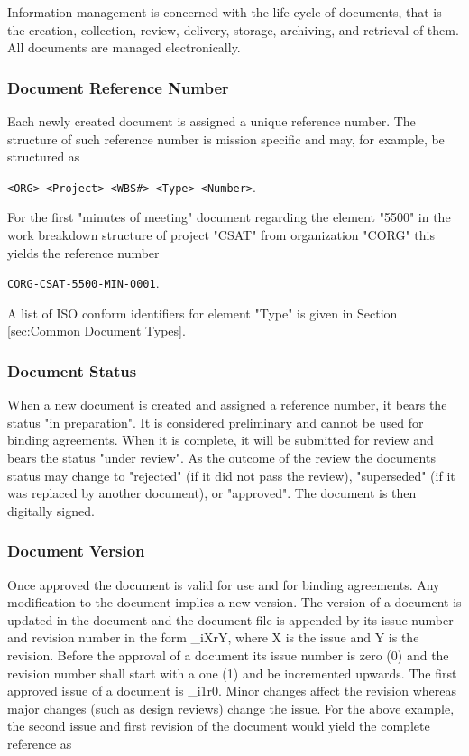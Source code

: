 Information management is concerned with the life cycle of documents, that is the creation, collection, review, delivery, storage, archiving, and retrieval of them. All documents are managed electronically.

\subsubsection{Document Reference Number}

Each newly created document is assigned a unique reference number. The structure of such reference number is mission specific and may, for example, be structured as

\texttt{<ORG>-<Project>-<WBS\#>-<Type>-<Number>}. 

For the first "minutes of meeting" document regarding the element "5500" in the work breakdown structure of  project "CSAT" from organization "CORG" this yields the reference number 

\texttt{CORG-CSAT-5500-MIN-0001}. 

A list of ISO conform identifiers for element "Type" is given in Section \ref{sec:Common Document Types}.

\subsubsection{Document Status}

When a new document is created and assigned a reference number, it bears the status "in preparation". It is considered preliminary and cannot be used for binding agreements. When it is complete, it will be submitted for review and bears the status "under review". As the outcome of the review the documents status may change to "rejected" (if it did not pass the review), "superseded" (if it was replaced by another document), or "approved". The document is then digitally signed.

\subsubsection{Document Version}

Once approved the document is valid for use and for binding agreements. Any modification to the document implies a new version. The version of a document is updated in the document  and the document file is appended by its issue number and revision number in the form \_iXrY, where X is the issue and Y is the revision. Before the approval of a document its issue number is zero (0) and the revision number shall start with a one (1) and be incremented upwards. The first approved issue of a document is \_i1r0. Minor changes affect the revision whereas major changes (such as design reviews) change the issue. For the above example, the second issue and first revision of the document would yield the complete reference as 

